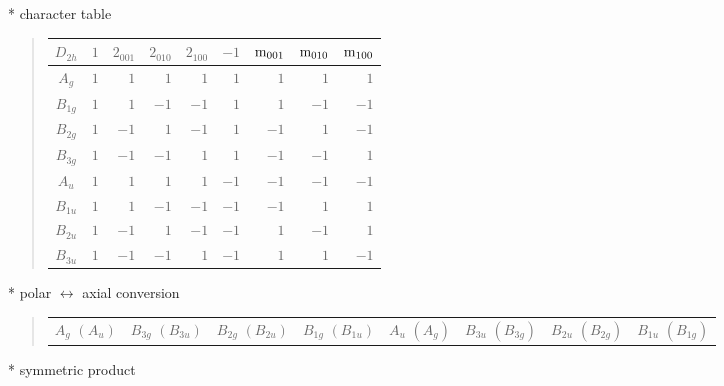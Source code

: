 \documentclass[fleqn,10pt,landscape]{jsarticle}
\begin{document}
* character table
\begin{quote}
\begin{tabular}{crrrrrrrr} \hline \hline
$ D_{2h} $ & $ 1 $ & $ 2{}_{001} $ & $ 2{}_{010} $ & $ 2{}_{100} $ & $ -1 $ & $ {\rm m}_{001} $ & $ {\rm m}_{010} $ & $ {\rm m}_{100} $ \\ \hline
$ A_{g} $ & $ 1 $ & $ 1 $ & $ 1 $ & $ 1 $ & $ 1 $ & $ 1 $ & $ 1 $ & $ 1 $ \\
$ B_{1g} $ & $ 1 $ & $ 1 $ & $ -1 $ & $ -1 $ & $ 1 $ & $ 1 $ & $ -1 $ & $ -1 $ \\
$ B_{2g} $ & $ 1 $ & $ -1 $ & $ 1 $ & $ -1 $ & $ 1 $ & $ -1 $ & $ 1 $ & $ -1 $ \\
$ B_{3g} $ & $ 1 $ & $ -1 $ & $ -1 $ & $ 1 $ & $ 1 $ & $ -1 $ & $ -1 $ & $ 1 $ \\
$ A_{u} $ & $ 1 $ & $ 1 $ & $ 1 $ & $ 1 $ & $ -1 $ & $ -1 $ & $ -1 $ & $ -1 $ \\
$ B_{1u} $ & $ 1 $ & $ 1 $ & $ -1 $ & $ -1 $ & $ -1 $ & $ -1 $ & $ 1 $ & $ 1 $ \\
$ B_{2u} $ & $ 1 $ & $ -1 $ & $ 1 $ & $ -1 $ & $ -1 $ & $ 1 $ & $ -1 $ & $ 1 $ \\
$ B_{3u} $ & $ 1 $ & $ -1 $ & $ -1 $ & $ 1 $ & $ -1 $ & $ 1 $ & $ 1 $ & $ -1 $ \\
 \hline \hline
\end{tabular}
\end{quote}
* polar $\leftrightarrow$ axial conversion
\begin{quote}
\begin{tabular}{cccccccc}
$ A_{g}\,\,(A_{u}) $ & $ B_{3g}\,\,(B_{3u}) $ & $ B_{2g}\,\,(B_{2u}) $ & $ B_{1g}\,\,(B_{1u}) $ & $ A_{u}\,\,(A_{g}) $ & $ B_{3u}\,\,(B_{3g}) $ & $ B_{2u}\,\,(B_{2g}) $ & $ B_{1u}\,\,(B_{1g}) $
\end{tabular}
\end{quote}
* symmetric product
\end{document}

